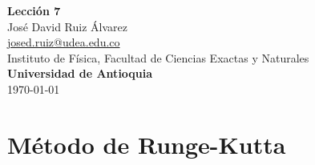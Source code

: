 \documentclass[10.5pt]{article}
\begin{document}
\noindent
\begin{minipage}[b]{0.75\linewidth}
{\LARGE\bf Lecci\'{o}n 7}\\ %
\large{Jos\'{e} David Ruiz \'{A}lvarez} \\
\small{\href{mailto:josed.ruiz@udea.edu.co}{josed.ruiz@udea.edu.co}} \\ %
\normalsize{Instituto de Física, Facultad de Ciencias Exactas y Naturales} \\%
\normalsize{\bf Universidad de Antioquia} \\[8mm]
\today %
\end{minipage}%




\section{Método de Runge-Kutta}
\end{document}
